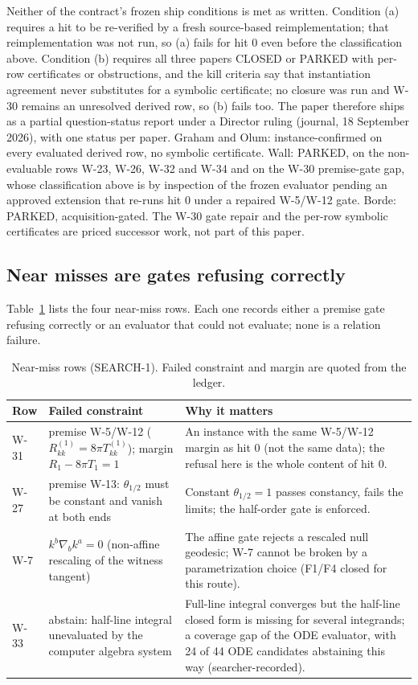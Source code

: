 \documentclass[11pt]{article}
\begin{document}
Neither of the contract's frozen ship conditions is met as written. Condition (a) requires a hit to be re-verified by a fresh source-based reimplementation; that reimplementation was not run, so (a) fails for hit 0 even before the classification above. Condition (b) requires all three papers CLOSED or PARKED with per-row certificates or obstructions, and the kill criteria say that instantiation agreement never substitutes for a symbolic certificate; no closure was run and W-30 remains an unresolved derived row, so (b) fails too. The paper therefore ships as a partial question-status report under a Director ruling (journal, 18 September 2026), with one status per paper. Graham and Olum: instance-confirmed on every evaluated derived row, no symbolic certificate. Wall: PARKED, on the non-evaluable rows W-23, W-26, W-32 and W-34 and on the W-30 premise-gate gap, whose classification above is by inspection of the frozen evaluator pending an approved extension that re-runs hit 0 under a repaired W-5/W-12 gate. Borde: PARKED, acquisition-gated. The W-30 gate repair and the per-row symbolic certificates are priced successor work, not part of this paper.

\subsection{Near misses are gates refusing correctly}
\label{sec:near}

Table~\ref{tab:near} lists the four near-miss rows. Each one records either a premise gate refusing correctly or an evaluator that could not evaluate; none is a relation failure.

\begin{table}[t]
\centering
\caption{Near-miss rows (SEARCH-1). Failed constraint and margin are quoted from the ledger.}
\label{tab:near}
\small
\begin{tabular}{llp{6.6cm}}
\toprule
Row & Failed constraint & Why it matters \\
\midrule
W-31 & premise W-5/W-12 ($R^{(1)}_{kk} = 8\pi T^{(1)}_{kk}$); margin $R_1 - 8\pi T_1 = 1$ & An instance with the same W-5/W-12 margin as hit 0 (not the same data); the refusal here is the whole content of hit 0. \\
W-27 & premise W-13: $\theta_{1/2}$ must be constant and vanish at both ends & Constant $\theta_{1/2} = 1$ passes constancy, fails the limits; the half-order gate is enforced. \\
W-7 & $k^b\nabla_b k^a = 0$ (non-affine rescaling of the witness tangent) & The affine gate rejects a rescaled null geodesic; W-7 cannot be broken by a parametrization choice (F1/F4 closed for this route). \\
W-33 & abstain: half-line integral unevaluated by the computer algebra system & Full-line integral converges but the half-line closed form is missing for several integrands; a coverage gap of the ODE evaluator, with 24 of 44 ODE candidates abstaining this way (searcher-recorded). \\
\bottomrule
\end{tabular}
\end{table}
\end{document}
